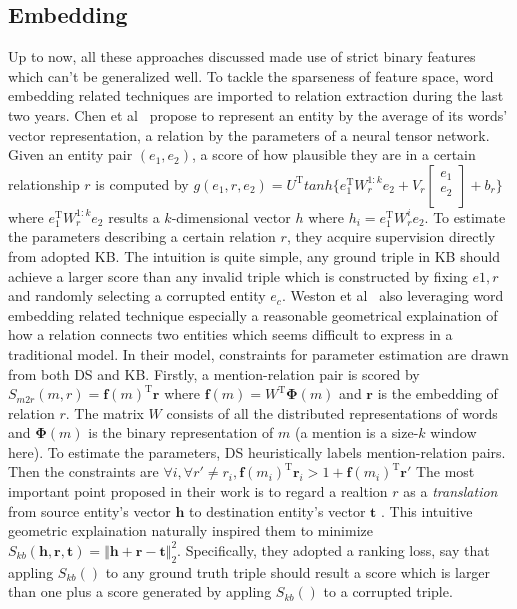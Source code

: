 \documentclass[10pt]{article} %
\theoremstyle{definition}
\theoremstyle{definition}
\begin{document}
\subsection{Embedding}
Up to now, all these approaches discussed made use of strict binary features which can't be generalized well. 
To tackle the sparseness of feature space, word embedding related techniques are imported to relation extraction during the last two years. 
Chen et al~\cite{cdq} propose to represent an entity by the average of its words' vector representation, a relation by the parameters of a neural tensor network. 
Given an entity pair $(e_1, e_2)$, a score of how plausible they are in a certain relationship $r$ is computed by 
$g(e_1, r, e_2)=U^{\mathrm{T}}tanh\{e_{1}^{\mathrm{T}}W_{r}^{1:k}e_2+V_{r}\begin{bmatrix}e_1\\e_2\\\end{bmatrix}+b_{r}\}$ where 
$e_{1}^{\mathrm{T}}W_{r}^{1:k}e_{2}$ results a $k$-dimensional vector $h$ where 
$h_{i}=e_{1}^{\mathrm{T}}W_{r}^{i}e_2$. 
To estimate the parameters describing a certain relation $r$, they acquire supervision directly from adopted KB. 
The intuition is quite simple, any ground triple in KB should achieve a larger score than any invalid triple which 
is constructed by fixing $e1, r$ and randomly selecting a corrupted entity $e_c$. 
Weston et al~\cite{embedding} also leveraging word embedding related technique especially a reasonable geometrical explaination of how a relation connects two entities
which seems difficult to express in a traditional model. 
In their model, constraints for parameter estimation are drawn from both DS and KB. 
Firstly, a mention-relation pair is scored by $S_{m2r}(m, r)=\mathbf{f}(m)^{\mathrm{T}}\mathbf{r}$ where 
$\mathbf{f}(m)=W^{\mathrm{T}}\boldsymbol{\Phi}(m)$ and $\mathbf{r}$ is the embedding of relation $r$. 
The matrix $W$ consists of all the distributed representations of words and $\boldsymbol{\Phi}(m)$ is 
the binary representation of $m$ (a mention is a size-$k$ window here). 
To estimate the parameters, DS heuristically labels mention-relation pairs. 
Then the constraints are $\forall i, \forall r'\neq r_i, \mathbf{f}(m_i)^{\mathrm{T}}\mathbf{r}_i > 1+\mathbf{f}(m_i)^{\mathrm{T}}\mathbf{r}'$
The most important point proposed in their work is to regard a realtion $r$ as a \emph{translation} from source entity's vector $\mathbf{h}$ to destination entity's vector $\mathbf{t}$ .
This intuitive geometric explaination naturally inspired them to minimize 
$S_{kb}(\mathbf{h},\mathbf{r},\mathbf{t})=\Vert \mathbf{h}+\mathbf{r}-\mathbf{t} \Vert_{2}^{2}$. 
Specifically, they adopted a ranking loss, say that appling $S_{kb}()$ to any ground truth triple should result a score 
which is larger than one plus a score generated by appling $S_{kb}()$ to a corrupted triple. 
\end{document}
